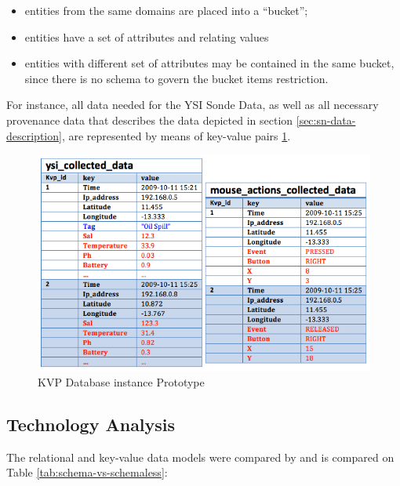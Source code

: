 \begin{itemize}
  \item entities from the same domains are placed into a ``bucket'';
  \item entities have a set of attributes and relating values
  \item entities with different set of attributes may be contained in the same
  bucket, since there is no schema to govern the bucket items restriction.
\end{itemize}

For instance, all data needed for the YSI Sonde Data, as well as all necessary
provenance data that describes the data depicted in section
\ref{sec:sn-data-description}, are represented by means of key-value pairs
\ref{fig:persistence-example-kvp}.

\begin{figure}[!h]
  \centering
  \includegraphics[scale=0.5]{../diagrams/persistence-example-kvp}
  \caption{KVP Database instance Prototype}
  \label{fig:persistence-example-kvp}
\end{figure}

\subsection{Technology Analysis}

The relational and key-value data models were compared by
\cite{db-is-rdbs-dommed} and is compared on Table
\ref{tab:schema-vs-schemaless}:

